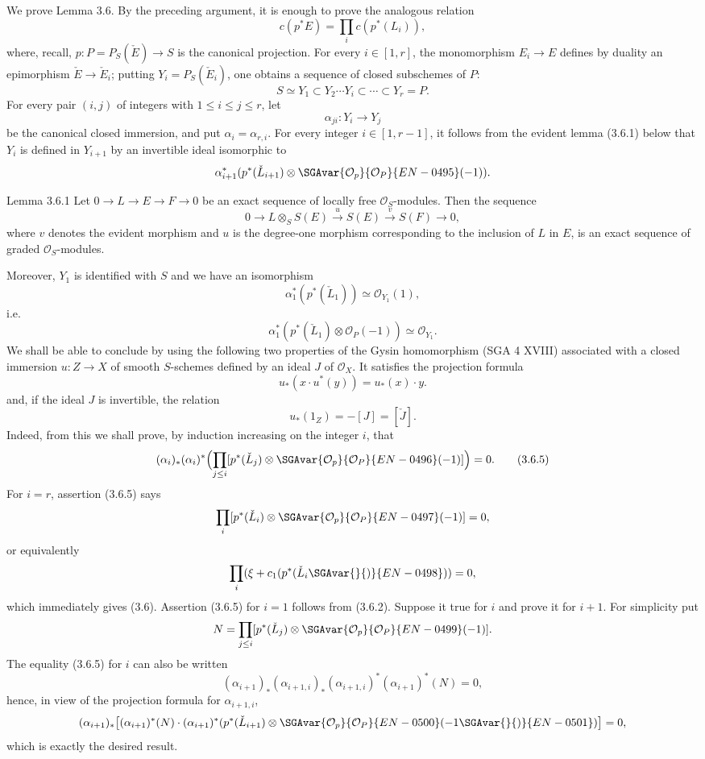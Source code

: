 We prove Lemma 3.6. By the preceding argument, it is enough to prove the analogous relation
\[
c(p^*E)=\prod_i c(p^*(L_i)),
\]
where, recall, $p:P=P_S(\check E)\to S$ is the canonical projection. For every $i\in[1,r]$, the monomorphism $E_i\to E$ defines by duality an epimorphism $\check E\to\check E_i$; putting $Y_i=P_S(\check E_i)$, one obtains a sequence of closed subschemes of $P$:
\[
S\simeq Y_1\subset Y_2\cdots Y_i\subset\cdots\subset Y_r=P.
\]
For every pair $(i,j)$ of integers with $1\le i\le j\le r$, let
\[
\alpha_{ji}:Y_i\to Y_j
\]
be the canonical closed immersion, and put $\alpha_i=\alpha_{r,i}$. For every integer $i\in[1,r-1]$, it follows from the evident lemma (3.6.1) below that $Y_i$ is defined in $Y_{i+1}$ by an invertible ideal isomorphic to
\[
\alpha_{i+1}^*(p^*(\check L_{i+1})\otimes\SGAvar{\mathcal O_p}{\mathcal O_P}{EN-0495}(-1)).
\]

\begin{statement}{Lemma 3.6.1}
Let $0\to L\to E\to F\to0$ be an exact sequence of locally free $\mathcal O_S$-modules. Then the sequence
\[
0\to L\otimes_S S(E)\xrightarrow{u}S(E)\xrightarrow{v}S(F)\to0,
\]
where $v$ denotes the evident morphism and $u$ is the degree-one morphism corresponding to the inclusion of $L$ in $E$, is an exact sequence of graded $\mathcal O_S$-modules.
\end{statement}

Moreover, $Y_1$ is identified with $S$ and we have an isomorphism
\[
\alpha_1^*(p^*(\check L_1))\simeq\mathcal O_{Y_1}(1),
\]
i.e.
\[
\alpha_1^*(p^*(\check L_1)\otimes\mathcal O_P(-1))\simeq \mathcal O_{Y_1}.
\tag{3.6.2}
\]
We shall be able to conclude by using the following two properties of the Gysin homomorphism (SGA 4 XVIII) associated with a closed immersion $u:Z\to X$ of smooth $S$-schemes defined by an ideal $J$ of $\mathcal O_X$. It satisfies the projection formula
\[
u_*(x\cdot u^*(y))=u_*(x)\cdot y.
\tag{3.6.3}
\]
and, if the ideal $J$ is invertible, the relation
\[
u_*(1_Z)=-[J]=[\check J].
\tag{3.6.4}
\]
Indeed, from this we shall prove, by induction increasing on the integer $i$, that
\[
(\alpha_i)_*(\alpha_i)^*\Bigl(\prod_{j\le i}[p^*(\check L_j)\otimes\SGAvar{\mathcal O_p}{\mathcal O_P}{EN-0496}(-1)]\Bigr)=0.
\tag{3.6.5}
\]
For $i=r$, assertion (3.6.5) says
\[
\prod_i[p^*(\check L_i)\otimes\SGAvar{\mathcal O_p}{\mathcal O_P}{EN-0497}(-1)]=0,
\]
or equivalently
\[
\prod_i(\xi+c_1(p^*(\check L_i\SGAvar{}{)}{EN-0498}))=0,
\]
which immediately gives (3.6). Assertion (3.6.5) for $i=1$ follows from (3.6.2). Suppose it true for $i$ and prove it for $i+1$. For simplicity put
\[
N=\prod_{j\le i}[p^*(\check L_j)\otimes\SGAvar{\mathcal O_p}{\mathcal O_P}{EN-0499}(-1)].
\]
The equality (3.6.5) for $i$ can also be written
\[
(\alpha_{i+1})_*(\alpha_{i+1,i})_*(\alpha_{i+1,i})^*(\alpha_{i+1})^*(N)=0,
\]
hence, in view of the projection formula for $\alpha_{i+1,i}$,
\[
(\alpha_{i+1})_*\bigl[(\alpha_{i+1})^*(N)\cdot(\alpha_{i+1})^*(p^*(\check L_{i+1})\otimes\SGAvar{\mathcal O_p}{\mathcal O_P}{EN-0500}(-1\SGAvar{}{)}{EN-0501})\bigr]=0,
\]
which is exactly the desired result.

